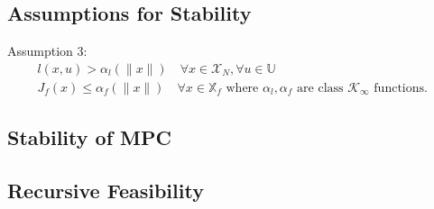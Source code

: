 \documentclass[english]{latex4ei/latex4ei_sheet}
\begin{document}
\begin{sectionbox}
\subsection{Assumptions for Stability}
Assumption 3:
$$
\begin{array}{l}{l(x, u)>\alpha_{l}(\|x\|) \quad \forall x \in \mathcal{X}_{N}, \forall u \in \mathbb{U}} \\ {J_{f}(x) \leq \alpha_{f}(\|x\|) \quad \forall x \in \mathbb{X}_{f} \text { where } \alpha_{l}, \alpha_{f} \text { are class } \mathcal{K}_{\infty} \text { functions. }}\end{array}
$$

\subsection{Stability of MPC}

\subsection{Recursive Feasibility}

\end{sectionbox}
\end{document}
